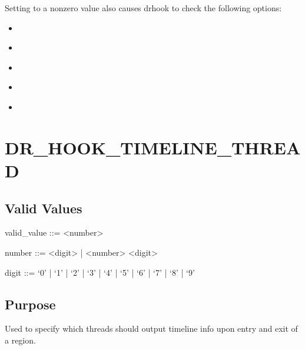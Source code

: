 \documentclass[letterpaper,10pt,english]{sphinxmanual}
\begin{document}
\sphinxAtStartPar
Setting  to a non\sphinxhyphen{}zero value also causes drhook to check the following options:
\begin{itemize}
\item {} 
\sphinxAtStartPar
{\hyperref[\detokenize{flag/flag:dr-hook-timeline-thread}]{}}

\item {} 
\sphinxAtStartPar
{\hyperref[\detokenize{flag/flag:dr-hook-timeline-format}]{}}

\item {} 
\sphinxAtStartPar
{\hyperref[\detokenize{flag/flag:dr-hook-timeline-unitno}]{}}

\item {} 
\sphinxAtStartPar
{\hyperref[\detokenize{flag/flag:dr-hook-timeline-freq}]{}}

\item {} 
\sphinxAtStartPar
{\hyperref[\detokenize{flag/flag:dr-hook-timeline-mb}]{}}

\end{itemize}


\section{DR\_HOOK\_TIMELINE\_THREAD}
\label{\detokenize{flag/flag:dr-hook-timeline-thread}}\label{\detokenize{flag/flag:id96}}

\subsection{Valid Values}
\label{\detokenize{flag/flag:id97}}
\begin{DUlineblock}{0em}
\item[] valid\_value ::= \textless{}number\textgreater{}
\item[] number ::= \textless{}digit\textgreater{} | \textless{}number\textgreater{} \textless{}digit\textgreater{}
\item[] digit ::= ‘0’ | ‘1’ | ‘2’ | ‘3’ | ‘4’ | ‘5’ | ‘6’ | ‘7’ | ‘8’ | ‘9’
\end{DUlineblock}


\subsection{Purpose}
\label{\detokenize{flag/flag:id98}}
\sphinxAtStartPar
Used to specify which threads should output timeline info upon entry and exit of a region.
\end{document}
